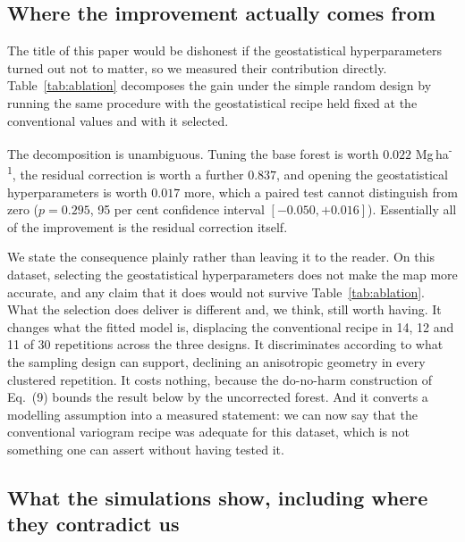 \documentclass[preprint,12pt,authoryear]{elsarticle}
\newcommand{\Mgha}{Mg\,ha\textsuperscript{-1}}
\begin{document}
\subsection{Where the improvement actually comes from}
\label{sec:ablation}

The title of this paper would be dishonest if the geostatistical
hyperparameters turned out not to matter, so we measured their contribution
directly. Table~\ref{tab:ablation} decomposes the gain under the simple random
design by running the same procedure with the geostatistical recipe held fixed
at the conventional values and with it selected.

\begin{table}[!ht]
\centering
\caption{Decomposition of the improvement under the simple random design, 30
repetitions, $n=500$, RMSE in \Mgha{}. The last two rows differ only in whether
the variogram family, practical range, binning, estimator and anisotropy are
selected out of fold or fixed at the conventional recipe.}
\label{tab:ablation}
\small

\end{table}

The decomposition is unambiguous. Tuning the base forest is worth $0.022$
\Mgha{}, the residual correction is worth a further $0.837$, and opening the
geostatistical hyperparameters is worth $0.017$ more, which a paired test cannot
distinguish from zero (\(p = 0.295\), 95 per cent confidence interval
$[-0.050, +0.016]$). Essentially all of the improvement is the residual
correction itself.

We state the consequence plainly rather than leaving it to the reader. On this
dataset, selecting the geostatistical hyperparameters does not make the map more
accurate, and any claim that it does would not survive Table~\ref{tab:ablation}.
What the selection does deliver is different and, we think, still worth having.
It changes what the fitted model is, displacing the conventional recipe in 14,
12 and 11 of 30 repetitions across the three designs. It discriminates according
to what the sampling design can support, declining an anisotropic geometry in
every clustered repetition. It costs nothing, because the do-no-harm
construction of Eq.~(9) bounds the result below by the uncorrected forest. And
it converts a modelling assumption into a measured statement: we can now say
that the conventional variogram recipe was adequate for this dataset, which is
not something one can assert without having tested it.

\subsection{What the simulations show, including where they contradict us}
\label{sec:sims}
\end{document}
